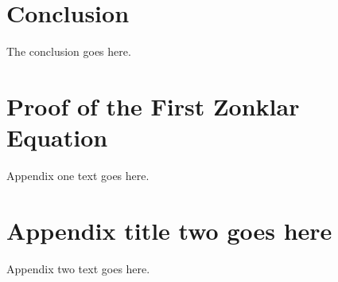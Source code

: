 \documentclass[journal]{IEEEtran}
\begin{document}


\section{Conclusion}
The conclusion goes here.\cite{IEEEexample:articledualmonths,IEEEexample:babel}



%


\appendices
\section{Proof of the First Zonklar Equation}
Appendix one text goes here.

\section{Appendix title two goes here}
Appendix two text goes here.
\end{document}
